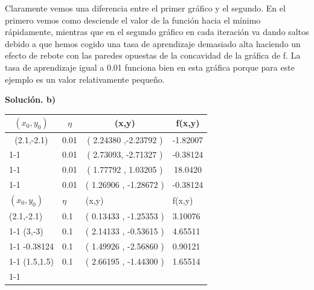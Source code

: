 \documentclass[a4paper,11pt]{article}
\begin{document}
Claramente vemos una diferencia entre el primer gráfico y el segundo. En el primero vemos como desciende el valor de la función hacia el mínimo rápidamente, mientras que en el segundo gráfico en cada iteración va dando saltos debido a que hemos cogido una tasa de aprendizaje demasiado alta haciendo un efecto de rebote con las paredes opuestas de la concavidad de la gráfica de f. La tasa de aprendizaje igual a 0.01 funciona bien en esta gráfica porque para este ejemplo es un valor relativamente pequeño. \\

\newpage

\textbf{Solución. b)}


\begin{table}[h]
\begin{tabular}{|l|lll}
\hline
\multicolumn{1}{|c|}{$(x_{0},y_{0})$} & \multicolumn{1}{c|}{$\eta$} & \multicolumn{1}{c|}{(x,y)}                 & \multicolumn{1}{c|}{f(x,y)}  \\ \hline
\multicolumn{1}{|c|}{(2.1,-2.1)}      & \multicolumn{1}{c}{0.01}    & \multicolumn{1}{c}{( 2.24380 ,-2.23792 )}  & \multicolumn{1}{c}{-1.82007} \\ \cline{1-1}
\multicolumn{1}{|c|}{(3,-3)}          & \multicolumn{1}{c}{0.01}    & \multicolumn{1}{c}{( 2.73093,  -2.71327 )} & \multicolumn{1}{c}{-0.38124} \\ \cline{1-1}
\multicolumn{1}{|c|}{(1.5,1.5)}       & \multicolumn{1}{c}{0.01}    & \multicolumn{1}{c}{( 1.77792 ,  1.03205 )} & \multicolumn{1}{c}{18.0420}  \\ \cline{1-1}
\multicolumn{1}{|c|}{(1,-1)}          & 0.01                        & ( 1.26906 ,  -1.28672 )                    & \multicolumn{1}{c}{-0.38124} \\ \hline
$(x_{0},y_{0})$                       & \multicolumn{1}{l|}{$\eta$} & \multicolumn{1}{l|}{(x,y)}                 & \multicolumn{1}{l|}{f(x,y)}  \\ \hline
(2.1,-2.1)                            & 0.1                         & ( 0.13433 , -1.25353 )                     & 3.10076                      \\ \cline{1-1}
(3,-3)                                & 0.1                         & ( 2.14133 , -0.53615 )                     & 4.65511                      \\ \cline{1-1}
-0.38124                              & 0.1                         & ( 1.49926 , -2.56860 )                     & 0.90121                      \\ \cline{1-1}
(1.5,1.5)                             & 0.1                         & ( 2.66195 , -1.44300 )                     & 1.65514                      \\ \cline{1-1}
\end{tabular}
\end{table}
\end{document}
